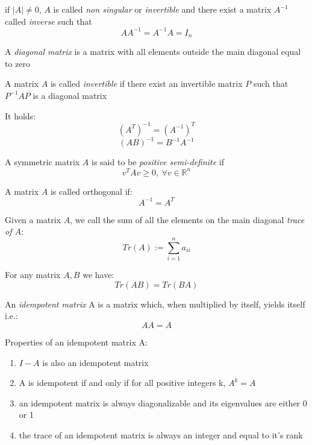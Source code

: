 \begin{defi}
if $|A| \not = 0$, $A$ is called \textit{non singular} or \textit{invertible} and there exist a matrix $A^{-1}$ called \textit{inverse} such that 
$$AA^{-1}=A^{-1}A=I_n$$
\end{defi}

\begin{defi}
	A \textit{diagonal matrix} is a matrix with all elements outside the main diagonal equal to zero
\end{defi}

\begin{defi}
	A matrix $A$ is called \textit{invertible} if there exist an invertible matrix $P$ such that $P^{-1}AP$ is a diagonal matrix
\end{defi}
\begin{prop}
It holds:
$$(A^T)^{-1}=(A^{-1})^T$$
$$(AB)^{-1}=B^{-1}A^{-1}$$
\end{prop}


\begin{defi}
A symmetric matrix $A$ is said to be \textit{positive semi-definite} if 
$$v^TAv \geq0, \ \forall v\in \mathbb{R}^n$$
\end{defi}

\begin{defi}
A matrix $A$ is called orthogonal if:
$$A^{-1}=A^T$$
\end{defi}

\begin{defi}
Given a matrix $A$, we call the sum of all the elements on the main diagonal  \textit{trace of $A$}:
$$Tr(A):= \sum_{i=1}^{n} a_{ii}$$
\end{defi}
\begin{prop}
For any matrix $A,B$ we have:
$$Tr(AB)=Tr(BA)$$
\end{prop}

\begin{defi}
An \textit{idempotent matrix} A is a matrix which, when multiplied by itself, yields itself i.e.:
$$AA=A$$
\end{defi}

\begin{prop}
	Properties of an idempotent matrix A:
	\begin{enumerate}
		\item $I-A$ is also an idempotent matrix
		\item A is idempotent if and only if for all positive integers k, $A^k=A$
		\item an idempotent matrix is always diagonalizable and its eigenvalues are either 0 or 1
		\item the trace of an idempotent matrix is always an integer and  equal to it's rank
	\end{enumerate}
\end{prop}


